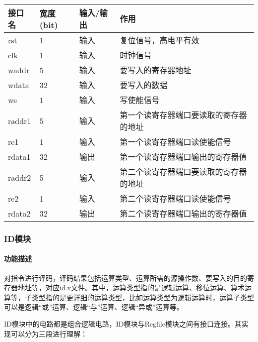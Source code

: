 \quad
	\begin{longtable}{|l|l|l|l|}
		\hline
		接口名 & 宽度(bit) & 输入/输出 & 作用 \\
		\hline
		rst & 1 & 输入 & 复位信号，高电平有效 \\
		\hline
		clk & 1 & 输入 & 时钟信号 \\
		\hline
		waddr & 5 & 输入 & 要写入的寄存器地址 \\
		\hline
		wdata & 32 & 输入 & 要写入的数据 \\
		\hline
		we & 1 & 输入 & 写使能信号 \\
		\hline
		raddr1 & 5 & 输入 & 第一个读寄存器端口要读取的寄存器的地址 \\
		\hline
		re1 & 1 & 输入 & 第一个读寄存器端口读使能信号 \\
		\hline
		rdata1 & 32 & 输出 & 第一个读寄存器端口输出的寄存器值 \\
		\hline
		raddr2 & 5 & 输入 & 第二个读寄存器端口要读取的寄存器的地址 \\
		\hline
		re2 & 1 & 输入 & 第二个读寄存器端口读使能信号 \\
		\hline
		rdata2 & 32 & 输出 & 第二个读寄存器端口输出的寄存器值 \\
		\hline
	\end{longtable}
\subsubsection{ID模块}
\paragraph{功能描述}
\quad

\quad

对指令进行译码，译码结果包括运算类型、运算所需的源操作数、要写入的目的寄存器地址等，对应id.v文件。其中，运算类型指的是逻辑运算、移位运算、算术运算等，子类型指的是更详细的运算类型，比如运算类型为逻辑运算时，运算子类型可以是逻辑“或”运算、逻辑“与”运算、逻辑“异或”运算等。

ID模块中的电路都是组合逻辑电路，ID模块与Regfile模块之间有接口连接。其实现可以分为三段进行理解：

